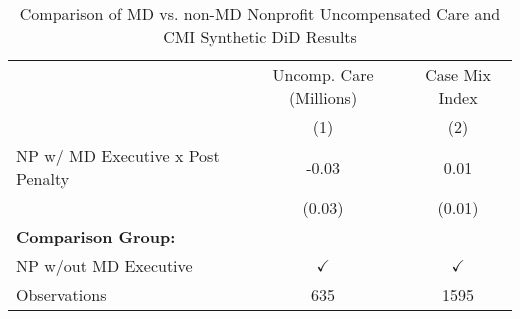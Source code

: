 \begin{table}[ht!]

\caption{\label{tab:MD_noMD_uncompCMI_synth}Comparison of MD vs. non-MD Nonprofit Uncompensated Care and CMI Synthetic DiD Results}
\centering
\begin{tabular}[t]{lcc}
\toprule
\multicolumn{1}{c}{ } & \multicolumn{1}{c}{Uncomp. Care (Millions)} & \multicolumn{1}{c}{Case Mix Index} \\
\cmidrule(l{3pt}r{3pt}){2-2} \cmidrule(l{3pt}r{3pt}){3-3}
 & (1) & (2)\\
\midrule
NP w/ MD Executive x Post Penalty & -0.03 & 0.01\\
 & (0.03) & (0.01)\\
\textbf{Comparison Group:} &  & \\
NP w/out MD Executive & $\checkmark$ & $\checkmark$\\
Observations & 635 & 1595\\
\bottomrule
\end{tabular}
\end{table}

